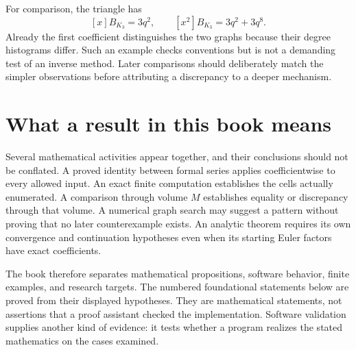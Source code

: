 \documentclass[
  11pt,
  a4paper,
]{report}
\begin{document}
For comparison, the triangle has \[
[x]B_{K_3}=3q^2,
\qquad [x^2]B_{K_3}=3q^2+3q^8.
\] Already the first coefficient distinguishes the two graphs because
their degree histograms differ. Such an example checks conventions but
is not a demanding test of an inverse method. Later comparisons should
deliberately match the simpler observations before attributing a
discrepancy to a deeper mechanism.

\hypertarget{what-a-result-in-this-book-means}{%
\section{What a result in this book
means}\label{what-a-result-in-this-book-means}}

Several mathematical activities appear together, and their conclusions
should not be conflated. A proved identity between formal series applies
coefficientwise to every allowed input. An exact finite computation
establishes the cells actually enumerated. A comparison through volume
\(M\) establishes equality or discrepancy through that volume. A
numerical graph search may suggest a pattern without proving that no
later counterexample exists. An analytic theorem requires its own
convergence and continuation hypotheses even when its starting Euler
factors have exact coefficients.

The book therefore separates mathematical propositions, software
behavior, finite examples, and research targets. The numbered
foundational statements below are proved from their displayed
hypotheses. They are mathematical statements, not assertions that a
proof assistant checked the implementation. Software validation supplies
another kind of evidence: it tests whether a program realizes the stated
mathematics on the cases examined.
\end{document}
